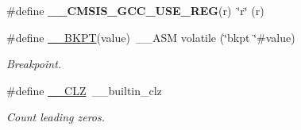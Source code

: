 \begin{DoxyCompactItemize}
\item 
\hypertarget{group___c_m_s_i_s___core___instruction_interface_ga9d94dee7402367961d2cf0accc00fd97}{\#define {\bfseries \-\_\-\-\_\-\-C\-M\-S\-I\-S\-\_\-\-G\-C\-C\-\_\-\-U\-S\-E\-\_\-\-R\-E\-G}(r)~\char`\"{}r\char`\"{} (r)}\label{group___c_m_s_i_s___core___instruction_interface_ga9d94dee7402367961d2cf0accc00fd97}

\item 
\#define \hyperlink{group___c_m_s_i_s___core___instruction_interface_ga15ea6bd3c507d3e81c3b3a1258e46397}{\-\_\-\-\_\-\-B\-K\-P\-T}(value)~\-\_\-\-\_\-\-A\-S\-M volatile (\char`\"{}bkpt \char`\"{}\#value)
\begin{DoxyCompactList}\small\item\em Breakpoint. \end{DoxyCompactList}\item 
\#define \hyperlink{group___c_m_s_i_s___core___instruction_interface_ga5d5bb1527e042be4a9fa5a33f65cc248}{\-\_\-\-\_\-\-C\-L\-Z}~\-\_\-\-\_\-builtin\-\_\-clz
\begin{DoxyCompactList}\small\item\em Count leading zeros. \end{DoxyCompactList}\end{DoxyCompactItemize}
